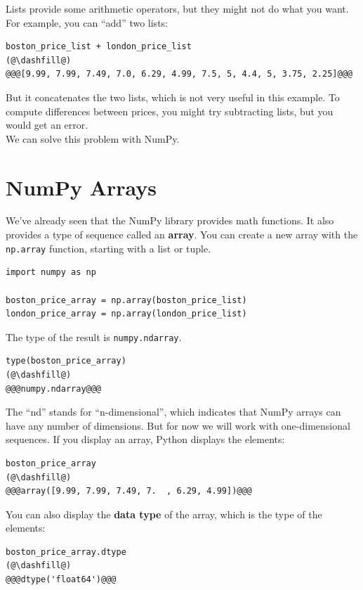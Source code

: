 Lists provide some arithmetic operators, but they might not do what you
want. For example, you can ``add'' two lists:

\begin{lstlisting}[]
boston_price_list + london_price_list
(@\dashfill@)
@@@[9.99, 7.99, 7.49, 7.0, 6.29, 4.99, 7.5, 5, 4.4, 5, 3.75, 2.25]@@@
\end{lstlisting}

But it concatenates the two lists, which is not very useful in this
example. To compute differences between prices, you might try
subtracting lists, but you would get an error.\\
We can solve this problem with NumPy.

\hypertarget{numpy-arrays}{%
\section{NumPy Arrays}\label{numpy-arrays}}

We've already seen that the NumPy library provides math functions. It
also provides a type of sequence called an \textbf{array}. You can
create a new array with the \passthrough{\lstinline!np.array!} function,
starting with a list or tuple.

\begin{lstlisting}[]
import numpy as np

boston_price_array = np.array(boston_price_list)
london_price_array = np.array(london_price_list)
\end{lstlisting}

The type of the result is \passthrough{\lstinline!numpy.ndarray!}.

\begin{lstlisting}[]
type(boston_price_array)
(@\dashfill@)
@@@numpy.ndarray@@@
\end{lstlisting}

The ``nd'' stands for ``n-dimensional'', which indicates that NumPy
arrays can have any number of dimensions. But for now we will work with
one-dimensional sequences. If you display an array, Python displays the
elements:

\begin{lstlisting}[]
boston_price_array
(@\dashfill@)
@@@array([9.99, 7.99, 7.49, 7.  , 6.29, 4.99])@@@
\end{lstlisting}

You can also display the \textbf{data type} of the array, which is the
type of the elements:

\begin{lstlisting}[]
boston_price_array.dtype
(@\dashfill@)
@@@dtype('float64')@@@
\end{lstlisting}

